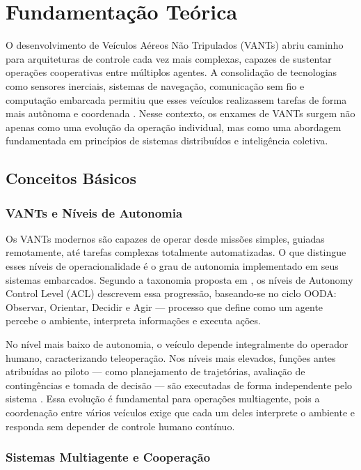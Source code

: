 
\section{Fundamentação Teórica}

O desenvolvimento de Veículos Aéreos Não Tripulados (VANTs) abriu caminho para arquiteturas de controle cada vez mais complexas, capazes de sustentar operações cooperativas entre múltiplos agentes. A consolidação de tecnologias como sensores inerciais, sistemas de navegação, comunicação sem fio e computação embarcada permitiu que esses veículos realizassem tarefas de forma mais autônoma e coordenada \citep{khan2017fanet}. Nesse contexto, os enxames de VANTs surgem não apenas como uma evolução da operação individual, mas como uma abordagem fundamentada em princípios de sistemas distribuídos e inteligência coletiva.

\subsection{Conceitos Básicos}

\subsubsection{VANTs e Níveis de Autonomia}

Os VANTs modernos são capazes de operar desde missões simples, guiadas remotamente, até tarefas complexas totalmente automatizadas. O que distingue esses níveis de operacionalidade é o grau de autonomia implementado em seus sistemas embarcados. Segundo a taxonomia proposta em \citep{sholes2007evolution}, os níveis de Autonomy Control Level (ACL) descrevem essa progressão, baseando-se no ciclo OODA: Observar, Orientar, Decidir e Agir — processo que define como um agente percebe o ambiente, interpreta informações e executa ações.

No nível mais baixo de autonomia, o veículo depende integralmente do operador humano, caracterizando teleoperação. Nos níveis mais elevados, funções antes atribuídas ao piloto — como planejamento de trajetórias, avaliação de contingências e tomada de decisão — são executadas de forma independente pelo sistema \citep{dong2004behavior}. Essa evolução é fundamental para operações multiagente, pois a coordenação entre vários veículos exige que cada um deles interprete o ambiente e responda sem depender de controle humano contínuo.

\subsubsection{Sistemas Multiagente e Cooperação}

